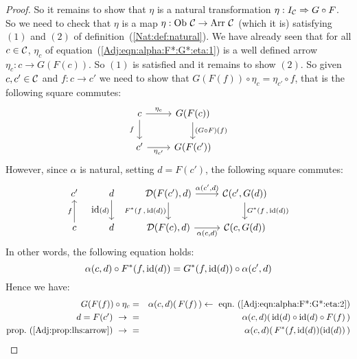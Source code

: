 \begin{proof}
    So it remains to show that $\eta$ is a natural transformation 
    $\eta:I_{\cal C}\Rightarrow G\circ F$. So we need to check that 
    $\eta$ is a map $\eta:\mbox{\rm Ob}\ \mbox{$\cal C$}\to\mbox{\rm Arr}\ \mbox{$\cal C$}$ (which it is) satisfying
    $(1)$ and $(2)$ of definition~(\ref{Nat:def:natural}). We have already
    seen that for all $c\in\mbox{$\cal C$}$, $\eta_{c}$ of
    equation~(\ref{Adj:eqn:alpha:F*:G*:eta:1}) is a well defined arrow
    $\eta_{c}:c\to G(F(c))$. So $(1)$ is satisfied and it remains to show $(2)$.
    So given $c,c'\in\mbox{$\cal C$}$ and $f:c\to c'$ we need to show that
    $G(F(f))\circ\eta_{c}=\eta_{c'}\circ f$, that is the following 
    square commutes:
        \[
            \begin{tikzcd}
                c\arrow[r, "\eta_{c}"]\arrow[d, swap,"f\ "]
                &G(F(c))\arrow[d, "(G\circ F)(f)"]
                \\
                c'\arrow[r, swap, "\eta_{c'}"]
                &G(F(c'))
            \end{tikzcd}
        \]
    However, since $\alpha$ is natural, setting $d=F(c')$, the following
    square commutes:
        \[
            \begin{tikzcd}
                c'
                &d\arrow[d,swap, "\id(d)"]
                &\Dat(F(c'),d)\arrow[r, "\alpha\mbox{$(c',d)$}"]
                \arrow[d, swap,"F^{*}\mbox{$(f\,,\,{\rm id}(d))$}"]
                &\Cat(c',G(d))
                \arrow[d, "G^{*}\mbox{$(f\,,\,{\rm id}(d))$}"]
                \\
                c\arrow[u, "f"]
                &d
                &\Dat(F(c),d)\arrow[r, swap, "\alpha\mbox{$(c,d)$}"]
                &\Cat(c,G(d))
            \end{tikzcd}
        \]
    In other words, the following equation holds:
        \begin{equation}\label{Adj:eqn:alpha:F*:G*:eta:4}
            \alpha(c,d)\circ F^{*}(f,\mbox{\rm id}(d)) = G^{*}(f,\mbox{\rm id}(d))\circ\alpha(c',d)
        \end{equation}
    Hence we have: 
        \begin{eqnarray*}G(F(f))\circ\eta_{c}
            &=&\alpha(c,d)(\,F(f)\,)
            \leftarrow\ \mbox{eqn.~(\ref{Adj:eqn:alpha:F*:G*:eta:2})}\\
            \mbox{$d=F(c')$}\ \to\ 
            &=&\alpha(c,d)(\,\id(d)\circ\id(d)\circ F(f)\,)\\
            \mbox{prop.~(\ref{Adj:prop:lhs:arrow})}\ \to\ 
            &=&\alpha(c,d)(\,F^{*}(f,\id(d))(\id(d))\,)\\

\end{eqnarray*}
\end{proof}
